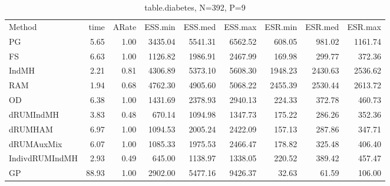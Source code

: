 \begin{table}
\begin{tabular}{l r r r r r r r r } 
          Method  &     time &    ARate &  ESS.min &  ESS.med &  ESS.max &  ESR.min &  ESR.med &  ESR.max \\ 
              PG  &     5.65 &     1.00 &  3435.04 &  5541.31 &  6562.52 &   608.05 &   981.02 &  1161.74 \\ 
              FS  &     6.63 &     1.00 &  1126.82 &  1986.91 &  2467.99 &   169.98 &   299.77 &   372.36 \\ 
           IndMH  &     2.21 &     0.81 &  4306.89 &  5373.10 &  5608.30 &  1948.23 &  2430.63 &  2536.62 \\ 
             RAM  &     1.94 &     0.68 &  4762.30 &  4905.60 &  5068.22 &  2455.39 &  2530.44 &  2613.72 \\ 
              OD  &     6.38 &     1.00 &  1431.69 &  2378.93 &  2940.13 &   224.33 &   372.78 &   460.73 \\ 
       dRUMIndMH  &     3.83 &     0.48 &   670.14 &  1094.98 &  1347.73 &   175.22 &   286.26 &   352.36 \\ 
         dRUMHAM  &     6.97 &     1.00 &  1094.53 &  2005.24 &  2422.09 &   157.13 &   287.86 &   347.71 \\ 
      dRUMAuxMix  &     6.07 &     1.00 &  1085.33 &  1975.53 &  2466.47 &   178.82 &   325.48 &   406.40 \\ 
  IndivdRUMIndMH  &     2.93 &     0.49 &   645.00 &  1138.97 &  1338.05 &   220.52 &   389.42 &   457.47 \\ 
              GP  &    88.93 &     1.00 &  2902.00 &  5477.16 &  9426.37 &    32.63 &    61.59 &   106.00
 \end{tabular}
\caption{table.diabetes, N=392, P=9}
\end{table}

